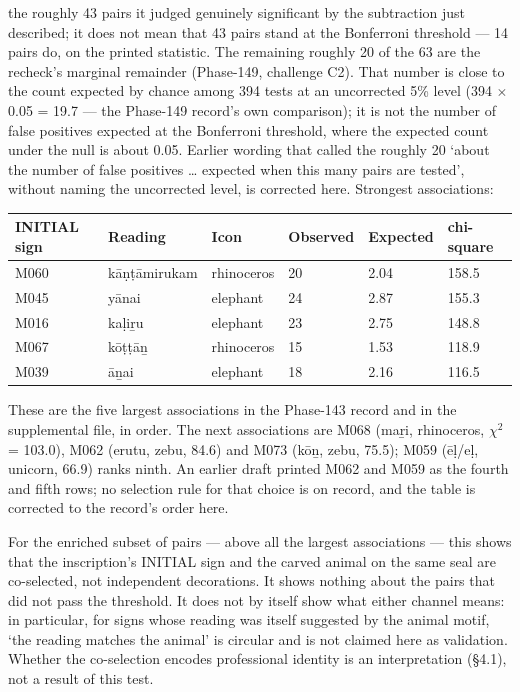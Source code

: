 \documentclass[
]{article}
\newcounter{none} %
\begin{document}
the roughly 43 pairs it judged genuinely significant by the subtraction just described; it does not mean that 43 pairs stand at the Bonferroni threshold --- 14 pairs do, on the printed statistic. The remaining roughly 20 of the 63 are the recheck's marginal remainder (Phase-149, challenge C2). That number is close to the count expected by chance among 394 tests at an uncorrected 5\% level (394 $\times$ 0.05 = 19.7 --- the Phase-149 record's own comparison); it is not the number of false positives expected at the Bonferroni threshold, where the expected count under the null is about 0.05. Earlier wording that called the roughly 20 `about the number of false positives \ldots{} expected when this many pairs are tested', without naming the uncorrected level, is corrected here. Strongest
associations:

{\def\LTcaptype{none} %
\begin{longtable}[]{@{}llllll@{}}
\toprule\noalign{}
INITIAL sign & Reading & Icon & Observed & Expected & chi-square \\
\midrule\noalign{}
\endhead
\bottomrule\noalign{}
\endlastfoot
M060 & kāṇṭāmirukam & rhinoceros & 20 & 2.04 & 158.5 \\
M045 & yānai & elephant & 24 & 2.87 & 155.3 \\
M016 & kaḷiṟu & elephant & 23 & 2.75 & 148.8 \\
M067 & kōṭṭāṉ & rhinoceros & 15 & 1.53 & 118.9 \\ 
M039 & āṉai & elephant & 18 & 2.16 & 116.5 \\
\end{longtable}
}

These are the five largest associations in the Phase-143 record and in the supplemental file, in order. The next associations are M068 (maṟi, rhinoceros, $\chi^2$ = 103.0), M062 (erutu, zebu, 84.6) and M073 (kōṉ, zebu, 75.5); M059 (ēḷ/eḷ, unicorn, 66.9) ranks ninth. An earlier draft printed M062 and M059 as the fourth and fifth rows; no selection rule for that choice is on record, and the table is corrected to the record's order here.

For the enriched subset of pairs --- above all the largest associations --- this shows that the inscription's INITIAL sign and the carved animal on the same seal are co-selected, not independent decorations. It shows nothing about the pairs that did not pass the threshold. It does not by itself show what either channel means: in particular, for signs whose reading was itself suggested by the animal motif, `the reading matches the animal' is circular and is not claimed here as validation. Whether the co-selection encodes professional identity is an interpretation (§4.1), not a result of this test.
\end{document}
